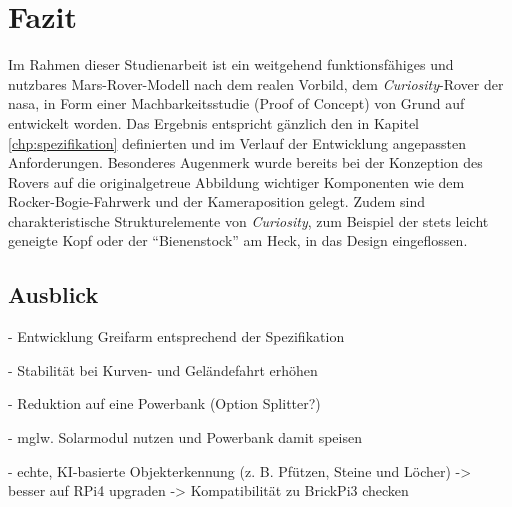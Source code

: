 \chapter{Fazit}
\label{chp:fazit}

Im Rahmen dieser Studienarbeit ist ein weitgehend funktionsfähiges und nutzbares Mars-Rover-Modell nach dem realen Vorbild, dem \textit{Curiosity}-Rover der \acs{nasa}, in Form einer Machbarkeitsstudie (Proof of Concept) von Grund auf entwickelt worden.
Das Ergebnis entspricht gänzlich den in Kapitel \ref{chp:spezifikation} definierten und im Verlauf der Entwicklung angepassten Anforderungen.
Besonderes Augenmerk wurde bereits bei der Konzeption des Rovers auf die originalgetreue Abbildung wichtiger Komponenten wie dem Rocker-Bogie-Fahrwerk und der Kameraposition gelegt.
Zudem sind charakteristische Strukturelemente von \textit{Curiosity}, zum Beispiel der stets leicht geneigte Kopf oder der \enquote{Bienenstock} am Heck, in das Design eingeflossen.


\section{Ausblick}
\label{sec:ausblick}

- Entwicklung Greifarm entsprechend der Spezifikation

- Stabilität bei Kurven- und Geländefahrt erhöhen

- Reduktion auf eine Powerbank (Option Splitter?)

- mglw. Solarmodul nutzen und Powerbank damit speisen

- echte, KI-basierte Objekterkennung (z. B. Pfützen, Steine und Löcher) -> besser auf RPi4 upgraden -> Kompatibilität zu BrickPi3 checken